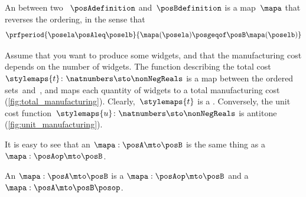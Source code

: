 \begin{definition}
    \label{def:antitone}
    An  between two ~$\posAdefinition$ and~$\posBdefinition$ is a map~$\mapa$ that reverses the ordering, in the sense that
    \begin{equation}
        \prfperiod{
            \posela \posAleq \poselb
        }{
            \mapa(\posela) \posgeqof\posB \mapa(\poselb)
        }
    \end{equation}
\end{definition}

\begin{example}
    Assume that you want to produce some widgets, and that the manufacturing cost depends on the number of widgets.
    The function describing the total cost~$\stylemaps{t}\colon \natnumbers \sto \nonNegReals$ is a map between the ordered sets~\natnumbers and~\nonNegReals, and maps each quantity of widgets to a total manufacturing cost (\cref{fig:total_manufacturing}).
    Clearly,~$\stylemaps{t}$ is a .
    Conversely, the unit cost function~$\stylemaps{u}\colon \natnumbers \sto \nonNegReals$ is antitone (\cref{fig:unit_manufacturing}).
\end{example}

\begin{marginfigure}

    \caption{Unit and total costs vs. number of widgets.}
\end{marginfigure}



It is easy to see that an  $\mapa: \posA \mto \posB$ is the same thing as a  $\mapa: \posAop \mto \posB$.

\begin{lemma}\label{lem:antitone-is-monotone}
    An  $\mapa: \posA \mto \posB$ is a  $\mapa: \posAop \mto \posB$
    and a  $\mapa: \posA \mto \posB\posop$.
\end{lemma}

